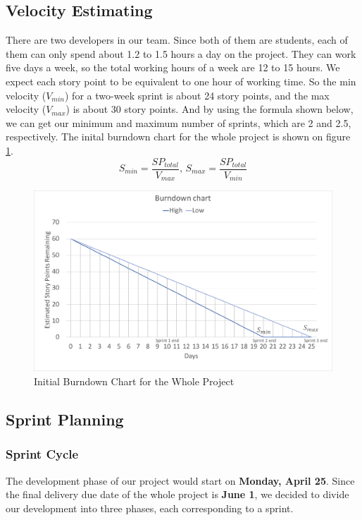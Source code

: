 \documentclass{report}
\begin{document}
\subsection{Velocity Estimating}
There are two developers in our team. Since both of them are students, each of them can only spend about 1.2 to 1.5 hours a day on the project. They can work five days a week, so the total working hours of a week are 12 to 15 hours. We expect each story point to be equivalent to one hour of working time. So the min velocity ($V_{min}$) for a two-week sprint is about 24 story points, and the max velocity ($V_{max}$) is about 30 story points. And by using the formula shown below, we can get our minimum and maximum number of sprints, which are 2 and 2.5, respectively. The inital burndown chart for the whole project is shown on figure \ref{fig:burndown1}.
$$
S_{min} = \frac{SP_{total}}{V_{max}}
\text{, } 
S_{max} = \frac{SP_{total}}{V_{min}}
$$
\begin{figure}[htp]
\centering
\includegraphics[width=\textwidth]{Figures/burndown1.pdf}
\caption{Initial Burndown Chart for the Whole Project}
\label{fig:burndown1}
\end{figure}

\subsection{Sprint Planning}
\subsubsection{Sprint Cycle}
\label{sec:sprintCycle}
The development phase of our project would start on \textbf{Monday, April 25}. Since the final delivery due date of the whole project is \textbf{June 1}, we decided to divide our development into three phases, each corresponding to a sprint.
\end{document}
